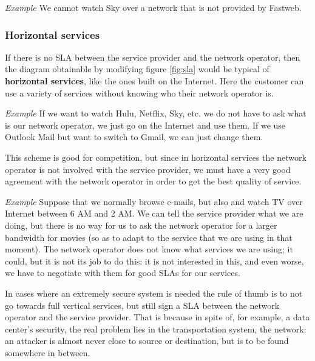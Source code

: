 \vspace{0.5em}

\emph{Example} We cannot watch Sky over a network that is not provided by Fastweb.

\vspace{0.5em}


\subsubsection*{Horizontal services}
If there is no SLA between the service provider and the network operator, then the diagram obtainable by modifying figure \ref{fig:sla} would be typical of \textbf{horizontal services}, like the ones built on the Internet. Here the customer can use a variety of services without knowing who their network operator is.

\vspace{0.5em}

\emph{Example} If we want to watch Hulu, Netflix, Sky, etc. we do not have to ask what is our network operator, we just go on the Internet and use them. If we use Outlook Mail but want to switch to Gmail, we can just change them.

\vspace{0.5em}

This scheme is good for competition, but since in horizontal services the network operator is not involved with the service provider, we must have a very good agreement with the network operator in order to get the best quality of service.

\vspace{0.5em}

\emph{Example} Suppose that we normally browse e-mails, but also and watch TV over Internet between 6 AM and 2 AM. We can tell the service provider what we are doing, but there is no way for us to ask the network operator for a larger bandwidth for movies (so as to adapt to the service that we are using in that moment). The network operator does not know what services we are using; it could, but it is not its job to do this: it is not interested in this, and even worse, we have to negotiate with them for good SLAs for our services.

\vspace{0.5em}


In cases where an extremely secure system is needed the rule of thumb is to not go towards full vertical services, but still sign a SLA between the network operator and the service provider. That is because in spite of, for example, a data center's security, the real problem lies in the transportation system, the network: an attacker is almost never close to source or destination, but is to be found somewhere in between.

